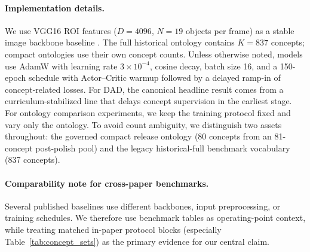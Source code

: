 \paragraph{Implementation details.}
We use VGG16 ROI features ($D{=}4096$, $N{=}19$ objects per frame) as a
stable image backbone baseline \citep{ref31}. The full historical ontology
contains $K{=}837$ concepts; compact ontologies use their own concept counts.
Unless otherwise noted, models use AdamW with learning rate
$3{\times}10^{-4}$, cosine decay, batch size 16, and a 150-epoch schedule with
Actor--Critic warmup followed by a delayed ramp-in of concept-related losses.
For DAD, the canonical headline result comes from a curriculum-stabilized line
that delays concept supervision in the earliest stage. For ontology comparison
experiments, we keep the training protocol fixed and vary only the ontology.
To avoid count ambiguity, we distinguish two assets throughout:
the governed compact release ontology (80 concepts from an 81-concept
post-polish pool) and the legacy historical-full benchmark vocabulary
(837 concepts).

\paragraph{Comparability note for cross-paper benchmarks.}
Several published baselines use different backbones, input preprocessing, or
training schedules. We therefore use benchmark tables as operating-point
context, while treating matched in-paper protocol blocks (especially
Table~\ref{tab:concept_sets}) as the primary evidence for our central claim.

